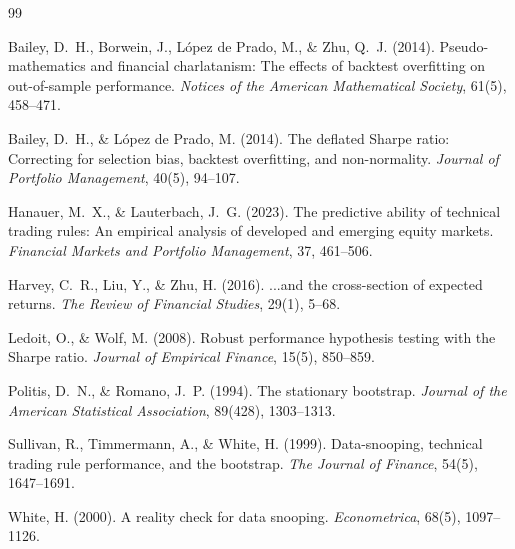 \documentclass[11pt]{article}
\begin{document}
\begin{thebibliography}{99}

Bailey, D.~H., Borwein, J., L{\'o}pez de Prado, M., \& Zhu, Q.~J. (2014).
Pseudo-mathematics and financial charlatanism: The effects of backtest overfitting on out-of-sample performance.
\textit{Notices of the American Mathematical Society}, 61(5), 458--471.

Bailey, D.~H., \& L{\'o}pez de Prado, M. (2014).
The deflated Sharpe ratio: Correcting for selection bias, backtest overfitting, and non-normality.
\textit{Journal of Portfolio Management}, 40(5), 94--107.

Hanauer, M.~X., \& Lauterbach, J.~G. (2023).
The predictive ability of technical trading rules: An empirical analysis of developed and emerging equity markets.
\textit{Financial Markets and Portfolio Management}, 37, 461--506.

Harvey, C.~R., Liu, Y., \& Zhu, H. (2016).
...and the cross-section of expected returns.
\textit{The Review of Financial Studies}, 29(1), 5--68.

Ledoit, O., \& Wolf, M. (2008).
Robust performance hypothesis testing with the Sharpe ratio.
\textit{Journal of Empirical Finance}, 15(5), 850--859.

Politis, D.~N., \& Romano, J.~P. (1994).
The stationary bootstrap.
\textit{Journal of the American Statistical Association}, 89(428), 1303--1313.

Sullivan, R., Timmermann, A., \& White, H. (1999).
Data-snooping, technical trading rule performance, and the bootstrap.
\textit{The Journal of Finance}, 54(5), 1647--1691.

White, H. (2000).
A reality check for data snooping.
\textit{Econometrica}, 68(5), 1097--1126.

\end{thebibliography}
\end{document}
